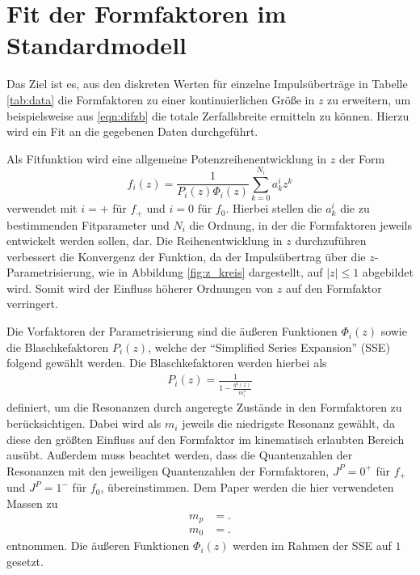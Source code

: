 \section{Fit der Formfaktoren im Standardmodell}

Das Ziel ist es, aus den diskreten Werten für einzelne Impulsüberträge in Tabelle \ref{tab:data} die Formfaktoren zu einer kontinuierlichen Größe in $z$ zu erweitern, um beispielsweise aus \eqref{eqn:difzb} die totale Zerfallsbreite ermitteln zu können.
Hierzu wird ein Fit an die gegebenen Daten durchgeführt.

Als Fitfunktion wird eine allgemeine Potenzreihenentwicklung in $z$ der Form
\begin{equation}
  \label{eqn:reihenentwicklung}
  f_i(z) = \frac{1}{P_i(z) \Phi_i(z)} \sum_{k=0}^{N_i} a_{k}^{i} z^{k}
\end{equation}
verwendet mit $i=+$ für $f_+$ und $i=0$ für $f_0$.
Hierbei stellen die $a_{k}^{i}$ die zu bestimmenden Fitparameter und $N_i$ die Ordnung, in der die Formfaktoren jeweils entwickelt werden sollen, dar.
Die Reihenentwicklung in $z$ durchzuführen verbessert die Konvergenz der Funktion, da der Impulsübertrag über die $z$-Parametrisierung, wie in Abbildung \ref{fig:z_kreis} dargestellt, auf $\lvert z \rvert \leq 1$ abgebildet wird.
Somit wird der Einfluss höherer Ordnungen von $z$ auf den Formfaktor verringert. 

Die Vorfaktoren der Parametrisierung sind die äußeren Funktionen  $\Phi_i(z)$ sowie die Blaschkefaktoren $P_i(z)$, welche der \enquote{Simplified Series Expansion} (SSE) \cite{PhysRevD.79.013008} folgend gewählt werden.
Die Blaschkefaktoren werden hierbei als
\begin{align*}
  P_i(z) = \frac{1}{1 - \frac{q^2(z)}{m_i^2}}
\end{align*}
definiert, um die Resonanzen durch angeregte Zustände in den Formfaktoren zu berücksichtigen. 
Dabei wird als $m_i$ jeweils die niedrigste Resonanz gewählt, da diese den größten Einfluss auf den Formfaktor im kinematisch erlaubten Bereich ausübt.
Außerdem muss beachtet werden, dass die Quantenzahlen der Resonanzen mit den jeweiligen Quantenzahlen der Formfaktoren, $J^P = 0^{+}$ für $f_+$ und $J^P = 1^-$ für $f_0$, übereinstimmen.
Dem Paper \cite{PhysRevD.94.094008} werden die hier verwendeten Massen zu
\begin{align*}
  m_p &= .\\
  m_0 & = .
\end{align*}
entnommen.
Die äußeren Funktionen $\Phi_i(z)$ werden im Rahmen der SSE auf $\num{1}$ gesetzt.

